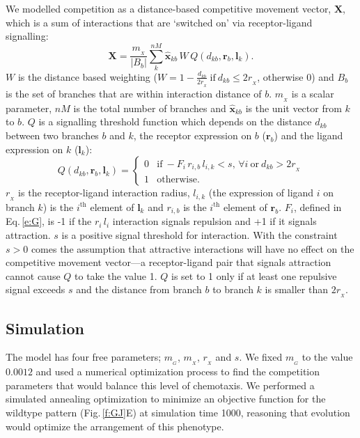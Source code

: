 \documentclass[11pt, a4paper]{article}
\begin{document}
 We modelled competition as a distance-based competitive movement vector, $\mathbf{X}$, which is a sum of interactions that are `switched on' via receptor-ligand signalling:
%
\begin{equation} \label{e:X}
\mathbf{X} = \frac{m_{\!_X}}{|B_{b}|} \sum_k^{nM} \hat{\mathbf{x}}_{kb}\,W\,Q(d_{kb}, \mathbf{r}_{b}, \mathbf{l}_{k}).
\end{equation}
%
$W$ is the distance based weighting ($W = 1-\frac{d_{kb}}{2r_{\!_X}}~\mathrm{if}~  d_{kb}\leq 2r_{\!_X}$, otherwise $0$) and $B_{b}$ is the set of branches that are within interaction distance of $b$. $m_{\!_X}$ is a scalar parameter, $nM$ is the total number of branches and $\hat{\mathbf{x}}_{kb}$ is the unit vector from $k$ to $b$.
%
$Q$ is a signalling threshold function which depends on the distance $d_{kb}$ between two branches $b$ and $k$, the receptor expression on $b$ ($\mathbf{r}_b$) and the ligand expression on $k$ ($\mathbf{l}_k$):
%
\begin{equation}
Q(d_{kb}, \mathbf{r}_{b}, \mathbf{l}_{k}) = \begin{cases}
                 0 & \mathrm{if}~-F_i\,r_{i,b}\,l_{i,k} <
                 s,\,\forall{i}~\mathrm{or}~d_{kb} > 2r_{\!_X} \\
                 1 & \mathrm{otherwise.}
     \end{cases}
\end{equation}
%
$r_{\!_X}$ is the receptor-ligand interaction radius, $l_{i,k}$ (the expression of ligand $i$ on branch $k$) is the $i^{\mathrm{th}}$ element of $\mathbf{l}_k$ and $r_{i,b}$ is the $i^{\mathrm{th}}$ element of $\mathbf{r}_b$.
$F_i$, defined in Eq.\,\ref{e:G}, is -1 if the $r_{i}\,l_{i}$ interaction signals repulsion and +1 if it signals attraction.
$s$ is a positive signal threshold for interaction.
With the constraint $s>0$ comes the assumption that attractive interactions will have no effect on the competitive movement vector---a receptor-ligand pair that signals attraction cannot cause $Q$ to take the value 1.
$Q$ is set to 1 only if at least one repulsive signal exceeds $s$ and the distance from branch $b$ to branch $k$ is smaller than $2 r_{\!_X}$.

\subsection*{Simulation}

The model has four free parameters; $m_{\!_G}$, $m_{\!_X}$, $r_{\!_X}$ and $s$. We fixed $m_{\!_G}$ to the value $0.0012$ and used a numerical optimization process to find the competition parameters that would balance this level of chemotaxis.
We performed a simulated annealing optimization to minimize an objective function for the wildtype pattern (Fig.\,\ref{f:GJ}E) at simulation time 1000, reasoning that evolution would optimize the arrangement of this phenotype.
\end{document}
